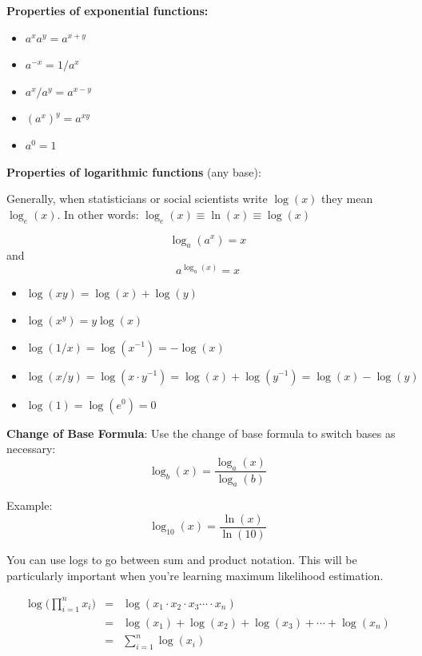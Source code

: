 \documentclass[
]{book}
\providecommand{\tightlist}{%
  \setlength{\itemsep}{0pt}\setlength{\parskip}{0pt}}
\theoremstyle{definition}
\theoremstyle{definition}
\theoremstyle{definition}
\theoremstyle{remark}
\begin{document}

\textbf{Properties of exponential functions:}

\begin{itemize}
\tightlist
\item
  \(a^x a^y = a^{x+y}\)
\item
  \(a^{-x} = 1/a^x\)
\item
  \(a^x/a^y = a^{x-y}\)
\item
  \((a^x)^y = a^{x y}\)
\item
  \(a^0 = 1\)
\end{itemize}

\textbf{Properties of logarithmic functions} (any base):

Generally, when statisticians or social scientists write \(\log(x)\) they mean \(\log_e(x)\). In other words: \(\log_e(x) \equiv \ln(x) \equiv \log(x)\)

\[\log_a(a^x)=x\] and
\[a^{\log_a(x)}=x\]

\begin{itemize}
\tightlist
\item
  \(\log(x y)=\log(x)+\log(y)\)
\item
  \(\log(x^y)=y\log(x)\)
\item
  \(\log(1/x)=\log(x^{-1})=-\log(x)\)
\item
  \(\log(x/y)=\log(x\cdot y^{-1})=\log(x)+\log(y^{-1})=\log(x)-\log(y)\)
\item
  \(\log(1)=\log(e^0)=0\)
\end{itemize}

\textbf{Change of Base Formula}: Use the change of base formula to switch bases as necessary:
\[\log_b(x) = \frac{\log_a(x)}{\log_a(b)}\]

Example: \[\log_{10}(x) = \frac{\ln(x)}{\ln(10)}\]

You can use logs to go between sum and product notation. This will be particularly important when you're learning maximum likelihood estimation.

\begin{eqnarray*}
            \log \bigg(\prod\limits_{i=1}^n x_i \bigg) &=& \log(x_1 \cdot x_2 \cdot x_3 \cdots \cdot x_n)\\
            &=& \log(x_1) + \log(x_2) + \log(x_3) + \cdots + \log(x_n)\\
            &=& \sum\limits_{i=1}^n \log (x_i)
\end{eqnarray*}
\end{document}
